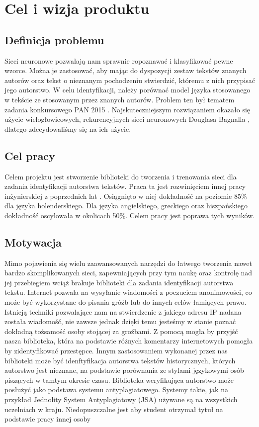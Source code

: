 \newpage
\section{Cel i wizja produktu}

\subsection{Definicja problemu}
Sieci neuronowe pozwalają nam sprawnie ropoznawać i klasyfikować pewne wzorce. Można je zastosować, aby
mając do dyspozycji zestaw tekstów znanych autorów oraz tekst o nieznanym pochodzeniu stwierdzić, któremu z nich 
przypisać jego autorstwo. W celu identyfikacji, należy porównać model języka stosowanego w tekście
ze stosowanym przez znanych autorów.
\newline
\newline
Problem ten był tematem zadania konkursowego PAN 2015 \cite{pan}.
Najskuteczniejszym rozwiązaniem okazało się użycie wielogłowicowych, rekurencyjnych sieci 
neuronowych Douglasa Bagnalla \cite{bagnall}, dlatego zdecydowaliśmy się na ich użycie.

 
\subsection{Cel pracy}
Celem projektu jest stworzenie biblioteki do tworzenia i trenowania sieci dla zadania 
identyfikacji autorstwa tekstów. Praca ta jest rozwinięciem innej pracy inżynierskiej z poprzednich lat \cite{radzio}.
Osiągnięto w niej dokładność na poziomie 85\% dla języka holenderskiego. Dla  języka angielskiego, greckiego
oraz hiszpańskiego dokładność oscylowała w okolicach 50\%. Celem pracy jest poprawa tych wyników.


\subsection{Motywacja}
Mimo pojawienia się wielu zaawansowanych narzędzi do łatwego tworzenia nawet bardzo skomplikowanych sieci, 
zapewniających przy tym naukę oraz kontrolę nad jej przebiegiem wciąż brakuje biblioteki dla zadania identyfikacji autorstwa 
tekstu. Internet pozwala na wysyłanie wiadomości z poczuciem anonimowości, co może być wykorzystane do pisania
gróźb lub do innych celów łamiących prawo. Istnieją techniki pozwalające nam na stwierdzenie z jakiego adresu IP nadana
została wiadomość, nie zawsze jednak dzięki temu jesteśmy w stanie poznać dokładną tożsamość osoby stojącej za groźbami.
Z pomocą mogła by przyjść nasza biblioteka, która na podstawie różnych komentarzy internetowych pomogła
by zidentyfikować przestępce.
Innym zastosowaniem wykonanej przez nas biblioteki może być idenftyfikacja autorstwa tekstów historycznych, których autorstwo jest
nieznane, na podstawie porównania ze stylami językowymi osób piszących w tamtym okresie czasu.
Biblioteka weryfikująca autorstwo może posłużyć jako podstawa systemu antyplagiatowego. Systemy takie, 
jak na przykład Jednolity System Antyplagiatowy (JSA) używane są na wszystkich uczelniach w kraju.
Niedopuszczalne jest aby student otrzymał tytuł na podstawie pracy innej osoby

